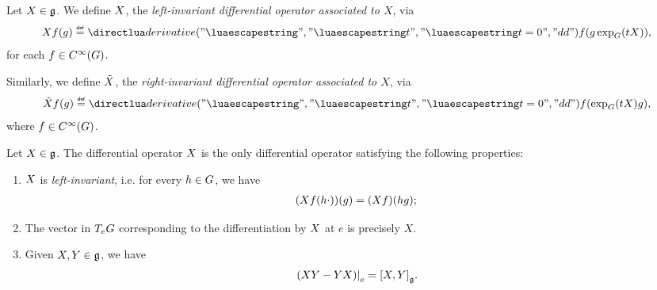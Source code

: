 \begin{definition}
\label{definition:invariant_differential_operators}
    Let $X \in \mathfrak{g}$.
    We define ${X}$,
    the \emph{left-invariant differential operator associated to $X$}, via
    \begin{align*}
        \LeftDifferentialOperatorFirstOrder{X} f(g)
            \defeq \D*{t}<t = 0> f(g \exp_\Group(t X)),
    \end{align*}
    for each $f \in {C^\infty(G)}$.

    Similarly,
    we define $\tilde{X}$,
    the \emph{right-invariant differential operator associated to $X$}, via
    \begin{align*}
        \RightDifferentialOperatorFirstOrder{X} f(g)
            \defeq \D*{t}<t = 0> f(\exp_\Group(t X) g),
    \end{align*}
    where $f \in {C^\infty(G)}$.
\end{definition}

\begin{proposition}
    Let $X \in \mathfrak{g}$.
    The differential operator ${X}$ is the only differential operator satisfying the following properties:
    \begin{enumerate}
        \item ${X}$ is \emph{left-invariant},
            i.e. for every $h \in G$, we have
            \begin{align*}
                (X f(h \cdot))(g) = (X f)(h g);
            \end{align*}
        \item The vector in $T_e G$ corresponding to the differentiation by ${X}$ at $e$ is precisely $X$.
        \item Given $X, Y \in \mathfrak{g}$, we have
            \begin{align*}
                \eval{%
                    (\LeftDifferentialOperatorFirstOrder{X} \LeftDifferentialOperatorFirstOrder{Y} - \LeftDifferentialOperatorFirstOrder{Y} \LeftDifferentialOperatorFirstOrder{X})
                }{e}
                = \LeftDifferentialOperatorFirstOrder{\LieBracket{X}{Y}}.
            \end{align*}
    \end{enumerate}
\end{proposition}

